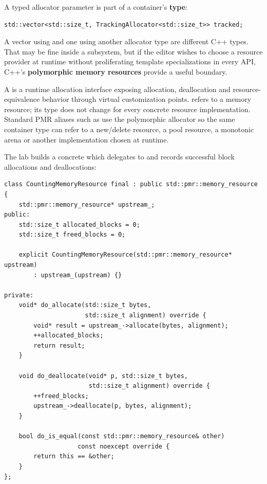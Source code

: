 A typed allocator parameter is part of a container's \textbf{type}:

\begin{verbatim}
std::vector<std::size_t, TrackingAllocator<std::size_t>> tracked;
\end{verbatim}

A vector using  and one using another allocator type are different C++ types. That may be fine inside a subsystem, but if the editor wishes to choose a resource provider at runtime without proliferating template specializations in every API, C++'s \textbf{polymorphic memory resources} provide a useful boundary.

A  is a runtime allocation interface exposing allocation, deallocation and resource-equivalence behavior through virtual customization points.  refers to a memory resource; its type does not change for every concrete resource implementation. Standard PMR aliases such as  use the polymorphic allocator so the same container type can refer to a new/delete resource, a pool resource, a monotonic arena or another implementation chosen at runtime.

The lab builds a concrete  which delegates to  and records successful block allocations and deallocations:

\begin{verbatim}
class CountingMemoryResource final : public std::pmr::memory_resource {
    std::pmr::memory_resource* upstream_;
public:
    std::size_t allocated_blocks = 0;
    std::size_t freed_blocks = 0;

    explicit CountingMemoryResource(std::pmr::memory_resource* upstream)
        : upstream_(upstream) {}

private:
    void* do_allocate(std::size_t bytes,
                      std::size_t alignment) override {
        void* result = upstream_->allocate(bytes, alignment);
        ++allocated_blocks;
        return result;
    }

    void do_deallocate(void* p, std::size_t bytes,
                       std::size_t alignment) override {
        ++freed_blocks;
        upstream_->deallocate(p, bytes, alignment);
    }

    bool do_is_equal(const std::pmr::memory_resource& other)
                    const noexcept override {
        return this == &other;
    }
};
\end{verbatim}


